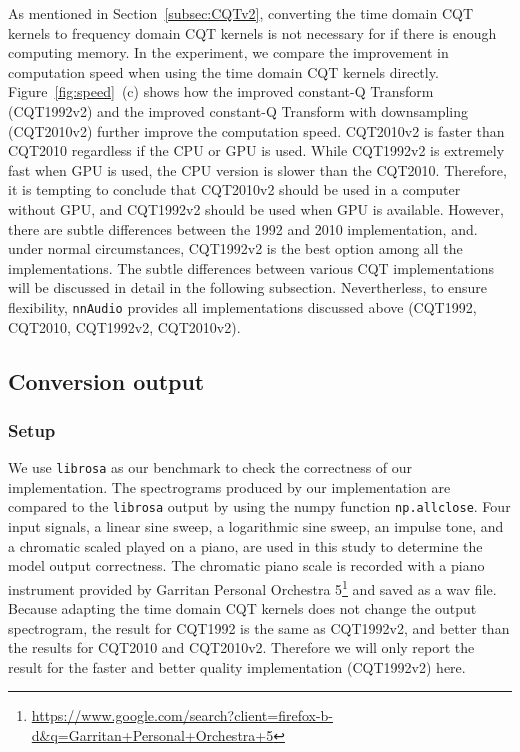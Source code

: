 \documentclass{ieeeaccess}
\newcommand{\nbh}[1]{\texttt{#1}}
\begin{document}
As mentioned in Section~\ref{subsec:CQTv2}, converting the time domain CQT kernels to frequency domain CQT kernels is not necessary for if there is enough computing memory. In the experiment, we compare the improvement in computation speed when using the time domain CQT kernels directly. Figure~\ref{fig:speed}~(c) shows how the improved constant-Q Transform (CQT1992v2) and the improved constant-Q Transform with downsampling (CQT2010v2) further improve the computation speed. CQT2010v2 is faster than CQT2010 regardless if the CPU or GPU is used. While CQT1992v2 is extremely fast when GPU is used, the CPU version is slower than the CQT2010. Therefore, it is tempting to conclude that CQT2010v2 should be used in a computer without GPU, and CQT1992v2 should be used when GPU is available. However, there are subtle differences between the 1992 and 2010 implementation, and. under normal circumstances, CQT1992v2 is the best option among all the implementations. The subtle differences between various CQT implementations will be discussed in detail in the following subsection. Nevertherless, to ensure flexibility, \nbh{nnAudio} provides all implementations discussed above (CQT1992, CQT2010, CQT1992v2, CQT2010v2). 





\subsection{Conversion output}

\subsubsection{Setup}
We use \nbh{librosa} as our benchmark to check the correctness of our implementation. The spectrograms produced by our implementation are compared to the \nbh{librosa} output by using the numpy function \nbh{np.allclose}. Four input signals, a linear sine sweep, a logarithmic sine sweep, an impulse tone, and a chromatic scaled played on a piano, are used in this study to determine the model output correctness. The chromatic piano scale is recorded with a piano instrument provided by Garritan Personal Orchestra 5\footnote{\url{https://www.google.com/search?client=firefox-b-d\&q=Garritan+Personal+Orchestra+5}} and saved as a wav file. Because adapting the time domain CQT kernels does not change the output spectrogram, the result for CQT1992 is the same as CQT1992v2, and better than the results for CQT2010 and CQT2010v2. Therefore we will only report the result for the faster and better quality implementation (CQT1992v2) here.
\end{document}
